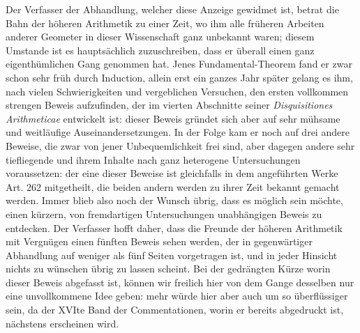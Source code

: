 \documentclass[12pt]{article}
\begin{document}
Der Verfasser der Abhandlung, welcher diese Anzeige gewidmet ist, betrat die Bahn der höheren Arithmetik zu einer Zeit, wo ihm alle früheren Arbeiten anderer Geometer in dieser Wissenschaft ganz unbekannt waren; diesem Umstande ist es hauptsächlich zuzuschreiben, dass er überall einen ganz eigenthümlichen Gang genommen hat. Jenes Fundamental-Theorem fand er zwar schon sehr früh durch Induction, allein erst ein ganzes Jahr später gelang es ihm, nach vielen Schwierigkeiten und vergeblichen Versuchen, den ersten vollkommen strengen Beweis aufzufinden, der im vierten Abschnitte seiner \textit{Disquisitiones Arithmeticae} entwickelt ist: dieser Beweis gründet sich aber auf sehr mühsame und weitläufige Auseinandersetzungen. In der Folge kam er noch auf drei andere Beweise, die zwar von jener Unbequemlichkeit frei sind, aber dagegen andere sehr tiefliegende und ihrem Inhalte nach ganz heterogene Untersuchungen voraussetzen: der eine dieser Beweise ist gleichfalls in dem angeführten Werke Art. 262 mitgetheilt, die beiden andern werden zu ihrer Zeit bekannt gemacht werden. Immer blieb also noch der Wunsch übrig, dass es möglich sein möchte, einen kürzern, von fremdartigen Untersuchungen unabhängigen Beweis zu entdecken. Der Verfasser hofft daher, dass die Freunde der höheren Arithmetik mit Vergnügen einen fünften Beweis sehen werden, der in gegenwärtiger Abhandlung auf weniger als fünf Seiten vorgetragen ist, und in jeder Hinsicht nichts zu wünschen übrig zu lassen scheint. Bei der gedrängten Kürze worin dieser Beweis abgefasst ist, können wir freilich hier von dem Gange desselben nur eine unvollkommene Idee geben: mehr würde hier aber auch um so überflüssiger sein, da der XVIte Band der Commentationen, worin er bereits abgedruckt ist, nächstens erscheinen wird.
\end{document}
